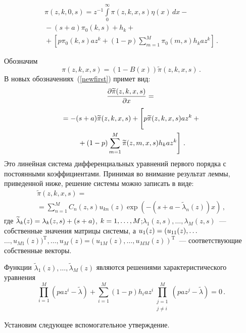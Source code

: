 \begin{multicols}{2}
\vspace*{-12pt}

\noindent
\begin{multline}
\pi(z,k,0,s)=z^{-1}\int\limits_0^{\infty}\pi(z,k,x,s)\eta(x)\,dx-{}\\
{}-
(s+a)\pi_0(k,s)+h_k+{}\\
{}+\left[p\pi_0(k,s)az^k+(1-p)\sum\limits_{m=1}^{M}\pi_0(m,s)h_k az^k\right]\,.
\label{newsecond}
\end{multline}

Обозначим
$$
\pi(z,k,x,s)=(1-B(x))\widetilde{\pi}(z,k,x,s)\,.
$$
В новых обозначениях~(\ref{newfirst}) примет вид:
\begin{multline}
\fr{\partial\widetilde{\pi}(z,k,x,s)}{\partial x}={}\\
{}=
-(s+a)\widetilde{\pi}(z,k,x,s)+\left[
\vphantom{\sum\limits_{m=1}^{M}}
p\widetilde{\pi}(z,k,x,s)az^k+{}\right.\\
\left.{}+(1-p)
\sum\limits_{m=1}^{M}\widetilde{\pi}(z,m,x,s)h_k az^k\right]\,.\label{system}
\end{multline}
Это линейная система дифференциальных уравнений первого порядка с постоянными
коэффициентами. Принимая во внимание результат леммы, приведенной ниже, решение
сис\-те\-мы можно записать в виде:
\begin{multline}
\widetilde{\pi}(z,k,x,s)={}\\
{}=\sum\limits_{n=1}^{M}C_n(z,s)u_{kn}(z)
\exp(-(s+a-\widetilde{\lambda}_n(z))x)\,,
\label{solution}
\end{multline}
где $\widetilde{\lambda}_k (z)\hm=\lambda_k (z,s)+(s+a)$,
$k\hm=1,\ldots ,M$;\linebreak $\lambda_1(z,s),\ldots,\lambda_M(z,s)$~---
собственные значения матрицы системы, а
$u_1(z)\hm=(u_{11}(z),\ldots$\linebreak $\ldots ,u_{M1}(z))^{\mathrm{T}},\ldots,
u_M (z)$=$(u_{1M}(z),\ldots,u_{MM}(z))^{\mathrm{T}}$~--- соответствующие собственные векторы.

Функции $\widetilde{\lambda}_1(z),\ldots,\widetilde{\lambda}_M(z)$
являются решениями характеристического уравнения
\begin{equation}
\prod\limits_{i=1}^M(paz^i-\widetilde{\lambda})+
\sum\limits_{i=1}^M(1-p)h_i az^i
\prod\limits_{\substack{j=1\\j\neq i}}^M(paz^j-\widetilde{\lambda})=0\,.
\label{determinant}
\end{equation}

Установим следующее вспомогательное утверж\-де\-ние.


\end{multicols}
